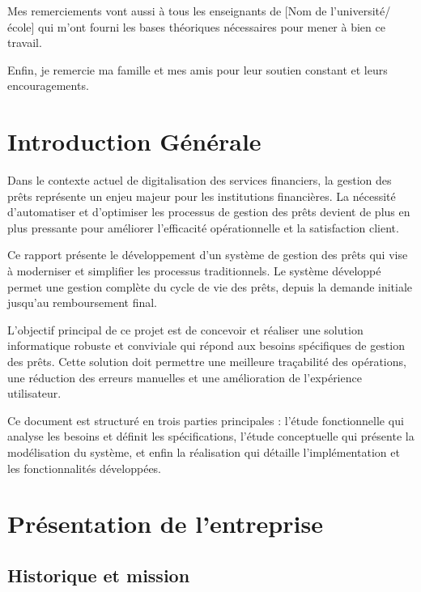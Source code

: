 \documentclass[12pt,a4paper]{report}
\begin{document}
Mes remerciements vont aussi à tous les enseignants de [Nom de l'université/école] qui m'ont fourni les bases théoriques nécessaires pour mener à bien ce travail.

Enfin, je remercie ma famille et mes amis pour leur soutien constant et leurs encouragements.

\newpage

\chapter*{Introduction Générale}

Dans le contexte actuel de digitalisation des services financiers, la gestion des prêts représente un enjeu majeur pour les institutions financières. La nécessité d'automatiser et d'optimiser les processus de gestion des prêts devient de plus en plus pressante pour améliorer l'efficacité opérationnelle et la satisfaction client.

Ce rapport présente le développement d'un système de gestion des prêts qui vise à moderniser et simplifier les processus traditionnels. Le système développé permet une gestion complète du cycle de vie des prêts, depuis la demande initiale jusqu'au remboursement final.

L'objectif principal de ce projet est de concevoir et réaliser une solution informatique robuste et conviviale qui répond aux besoins spécifiques de gestion des prêts. Cette solution doit permettre une meilleure traçabilité des opérations, une réduction des erreurs manuelles et une amélioration de l'expérience utilisateur.

Ce document est structuré en trois parties principales : l'étude fonctionnelle qui analyse les besoins et définit les spécifications, l'étude conceptuelle qui présente la modélisation du système, et enfin la réalisation qui détaille l'implémentation et les fonctionnalités développées.

\newpage

\chapter*{Présentation de l'entreprise}

\section*{Historique et mission}
\end{document}
